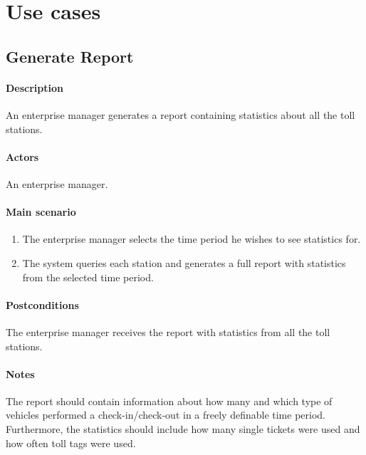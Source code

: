 \documentclass{report}
\begin{document}
\section{Use cases}
\subsection{Generate Report}
\paragraph{Description}
An enterprise manager generates a report containing statistics about all the toll stations.
\paragraph{Actors}
An enterprise manager.
\paragraph{Main scenario}
\begin{enumerate}
\item The enterprise manager selects the time period he wishes to see statistics for.
\item The system queries each station and generates a full report with statistics from the selected time period.
\end{enumerate}
\paragraph{Postconditions}
The enterprise manager receives the report with statistics from all the toll stations.
\paragraph{Notes}
The report should contain information about how many and which type of vehicles performed a check-in/check-out in a freely definable time period. Furthermore, the statistics should include how many single tickets were
used and how often toll tags were used.
\end{document}
